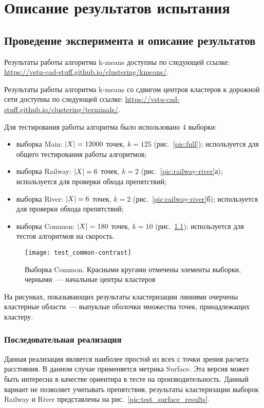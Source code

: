 \chapter{Описание результатов испытания}
\section{Проведение эксперимента и описание результатов}
Результаты работы алгоритма k-means доступны по следующей ссылке:\linebreak
\url{https://vstu-cad-stuff.github.io/clustering/kmeans/}.

Результаты работы алгоритма k-means со сдвигом центров кластеров к дорожной сети доступны по следующей ссылке:\linebreak
\url{https://vstu-cad-stuff.github.io/clustering/terminals/}.

Для тестирования работы алгоритма было использовано 4 выборки:
\begin{itemize}
    \item выборка Main: \( \left|X\right| = 12 000 \) точек, \( k = 125 \) (рис.~\ref{pic:full}); используется для общего тестирования работы алгоритмов;
    \item выборка Railway: \( \left|X\right| = 6 \) точек, \( k = 2 \) (рис.~\ref{pic:railway-river}а); используется для проверки обхода препятствий;
    \item выборка River: \( \left|X\right| = 6 \) точек, \( k = 2 \) (рис.~\ref{pic:railway-river}б); используется для проверки обхода препятствий;
    \item выборка Common: \( \left|X\right| = 180 \) точек, \( k = 10 \) (рис.~\ref{pic:common}); используется для тестов алгоритмов на скорость.
\end{itemize}
\begin{figure}[h!]
    \centering
    \texttt{[image: test\_common-contrast]}\\[1ex]
    \parbox{.9\textwidth}{\caption{Выборка Common. Красными кругами отмечены элементы выборки, черными~--- начальные центры кластеров}\label{pic:common}}
\end{figure}

На рисунках, показывающих результаты кластеризации линиями очерчены кластерные области~--- выпуклые оболочки множества точек, принадлежащих кластеру.

\subsection{Последовательная реализация}
Данная реализация является наиболее простой из всех с точки зрения расчета расстояния. В данном случае применяется метрика Surface. Эта версия может быть интересна в качестве ориентира в тесте на производительность. Данный вариант не позволяет учитывать препятствия, результаты кластеризации выборок Railway и River представлены на рис.~\ref{pic:test_surface_results}.

